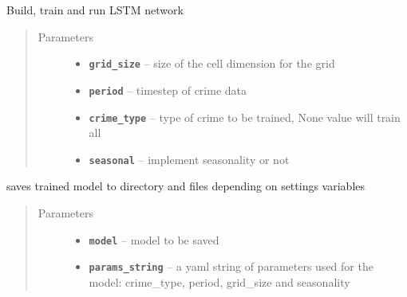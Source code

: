\documentclass[letterpaper,10pt,english]{sphinxmanual}
\begin{document}

\begin{fulllineitems}
\label{api/crimeprediction:crimeprediction.network.run_network}
Build, train and run LSTM network
\begin{quote}\begin{description}
\item[{Parameters}] \leavevmode\begin{itemize}
\item {} 
\textbf{\texttt{grid\_size}} -- size of the cell dimension for the grid

\item {} 
\textbf{\texttt{period}} -- timestep of crime data

\item {} 
\textbf{\texttt{crime\_type}} -- type of crime to be trained, None value will
train all

\item {} 
\textbf{\texttt{seasonal}} -- implement seasonality or not

\end{itemize}

\end{description}\end{quote}

\end{fulllineitems}


\begin{fulllineitems}
\label{api/crimeprediction:crimeprediction.network.save_trained_model}
saves trained model to directory and files depending on settings variables
\begin{quote}\begin{description}
\item[{Parameters}] \leavevmode\begin{itemize}
\item {} 
\textbf{\texttt{model}} -- model to be saved

\item {} 
\textbf{\texttt{params\_string}} -- a yaml string of parameters used for the model: crime\_type, period, grid\_size and seasonality

\end{itemize}

\end{description}\end{quote}

\end{fulllineitems}
\end{document}
